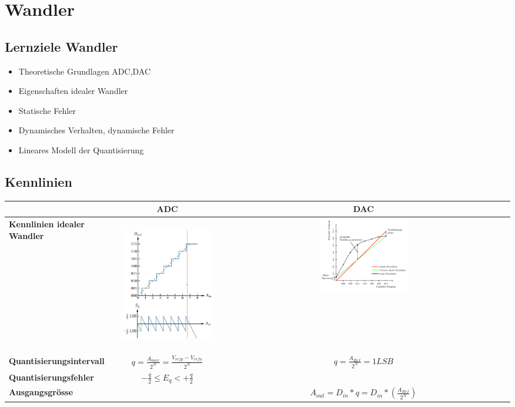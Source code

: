 \section{Wandler}

\subsection{Lernziele Wandler}
\begin{itemize}
\item Theoretische Grundlagen ADC,DAC
\item Eigenschaften idealer Wandler
\item Statische Fehler
\item Dynamisches Verhalten, dynamische Fehler
\item Lineares Modell der Quantisierung 
\end{itemize}


\subsection{Kennlinien}

\begin{tabular}{|p{}|c|c|}
	\hline
	& \textbf{ADC} & \textbf{DAC} 
	\\ \hline
	\textbf{Kennlinien idealer Wandler}
	& \parbox[c][6cm]{0.31\textwidth}{\includegraphics[height=5.9cm]{./pictures/idealerADC.jpg}}
	& \parbox[c]{0.31\textwidth}{\includegraphics[width=0.31\textwidth]{./pictures/idealerDAC.png}}
	\\ \hline
	\textbf{Quantisierungsintervall}
	& $q = \frac{A_{max}}{2^N} = \frac{V_{refp}-V_{refn}}{2^N}$
	& $q = \frac{A_{Ref}}{2^N} = 1LSB $
	\\ \hline
	\textbf{Quantisierungsfehler}
	& $ -\frac{q}{2}\leq E_{q}<+\frac{q}{2} $
	&
	\\ \hline 
	\textbf{Ausgangsgrösse}
	&
	& $A_{out} = D_{in}*q = D_{in}*(\frac{A_{Ref}}{2^N})$
	\\ \hline
\end{tabular}
\newpage


